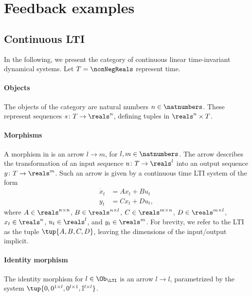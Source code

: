 

\section{Feedback examples}

\subsection{Continuous LTI}
In the following, we present the category of continuous linear time-invariant dynamical systems. Let $T=\nonNegReals$ represent time.

\paragraph{Objects} The objects of the category are natural numbers $n\in \natnumbers $. These represent sequences $s\colon T\to \reals^n$, defining tuples in $\reals^n\times T$.

\paragraph{Morphisms} A morphism in \LTI is an arrow $l\to m$, for $l,m\in \natnumbers $. The arrow describes the transformation of an input sequence $u\colon T\to \reals^l$ into an output sequence $y\colon T\to \reals^m$. Such an arrow is given by a continuous time LTI system of the form
\begin{equation}
  \begin{aligned}
    \dot{x}_{t}&=A x_{t}+B u_{t}\\
    y_{t}&=C x_{t} +D u_{t},
  \end{aligned}
\end{equation}
where $A\in \reals^{n\times n}$, $B\in \reals^{n\times l}$, $C\in \reals^{m\times n}$, $D\in \reals^{m\times l}$, $x_t\in \reals^n$, $u_t\in \reals^l$, and $y_t\in \reals^m$. For brevity, we refer to the LTI as the tuple $\tup{A,B,C,D}$, leaving the dimensions of the input/output implicit.

\paragraph{Identity morphism}
The identity morphism for $l\in \Ob_\LTI$ is an arrow $l\to l$, parametrized by the system $\tup{0,0^{1\times l},0^{l\times 1},\mathbb{I}^{l\times l}}$.

